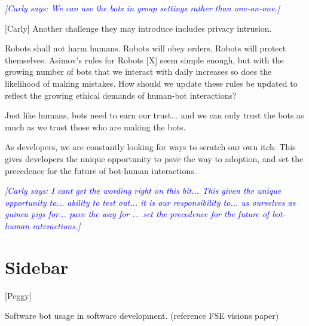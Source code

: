 \documentclass{sig-alternate}
\newcommand{\cl}[1]{\textcolor{blue}{{\it [Carly says: #1]}}}
\begin{document}
	\cl{We can use the bots in group settings rather than one-on-one.}

	[Carly]
	Another challenge they may introduce includes privacy intrusion. 

	Robots shall not harm humans. Robots will obey orders. Robots will protect themselves.  Asimov's rules for Robots [X] seem simple enough, but with the growing number of bots that we interact with daily increases so does the likelihood of making mistakes. How should we update these rules be updated to reflect the growing ethical demands of human-bot interactions?

	Just like humans, bots need to earn our trust... and we can only trust the bots as much as we trust those who are making the bots. 

	As developers, we are constantly looking for ways to scratch our own itch.  This gives developers the unique opportunity to pave the way to adoption, and set the precedence for the future of bot-human interactions. 


	\cl{I cant get the wording right on this bit...  This given the unique opportunity to... ability to test out... it is our responsibility to... us ourselves as guinea pigs for... pave the way for ... set the precedence for the future of bot-human interactions.}



\section{Sidebar}

[Peggy]

Software bot usage in software development.
(reference FSE visions paper)




%



%


%

\listoftodos
%
%
\end{document}
